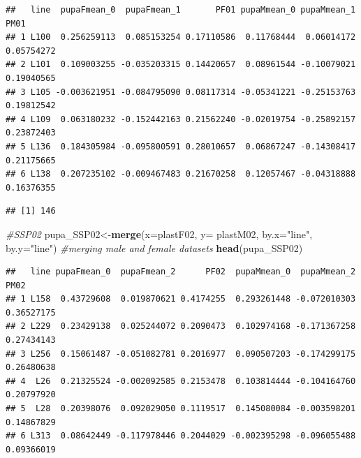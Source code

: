 \documentclass[
]{article}
\newenvironment{Shaded}{\begin{snugshade}}{\end{snugshade}}
\newcommand{\CommentTok}[1]{\textcolor[rgb]{0.56,0.35,0.01}{\textit{#1}}}
\newcommand{\DataTypeTok}[1]{\textcolor[rgb]{0.13,0.29,0.53}{#1}}
\newcommand{\KeywordTok}[1]{\textcolor[rgb]{0.13,0.29,0.53}{\textbf{#1}}}
\newcommand{\NormalTok}[1]{#1}
\newcommand{\OperatorTok}[1]{\textcolor[rgb]{0.81,0.36,0.00}{\textbf{#1}}}
\newcommand{\StringTok}[1]{\textcolor[rgb]{0.31,0.60,0.02}{#1}}
\begin{document}
\begin{verbatim}
##   line  pupaFmean_0  pupaFmean_1       PF01 pupaMmean_0 pupaMmean_1       PM01
## 1 L100  0.256259113  0.085153254 0.17110586  0.11768444  0.06014172 0.05754272
## 2 L101  0.109003255 -0.035203315 0.14420657  0.08961544 -0.10079021 0.19040565
## 3 L105 -0.003621951 -0.084795090 0.08117314 -0.05341221 -0.25153763 0.19812542
## 4 L109  0.063180232 -0.152442163 0.21562240 -0.02019754 -0.25892157 0.23872403
## 5 L136  0.184305984 -0.095800591 0.28010657  0.06867247 -0.14308417 0.21175665
## 6 L138  0.207235102 -0.009467483 0.21670258  0.12057467 -0.04318888 0.16376355
\end{verbatim}

\begin{Shaded}
\end{Shaded}

\begin{verbatim}
## [1] 146
\end{verbatim}

\begin{Shaded}
\begin{Highlighting}[]
\CommentTok{#SSP02}
\NormalTok{pupa_SSP02<-}\KeywordTok{merge}\NormalTok{(}\DataTypeTok{x=}\NormalTok{plastF02, }\DataTypeTok{y=}\NormalTok{ plastM02, }\DataTypeTok{by.x=}\StringTok{"line"}\NormalTok{, }\DataTypeTok{by.y=}\StringTok{"line"}\NormalTok{) }\CommentTok{#merging male and female datasets}
\KeywordTok{head}\NormalTok{(pupa_SSP02)}
\end{Highlighting}
\end{Shaded}

\begin{verbatim}
##   line pupaFmean_0  pupaFmean_2      PF02  pupaMmean_0  pupaMmean_2       PM02
## 1 L158  0.43729608  0.019870621 0.4174255  0.293261448 -0.072010303 0.36527175
## 2 L229  0.23429138  0.025244072 0.2090473  0.102974168 -0.171367258 0.27434143
## 3 L256  0.15061487 -0.051082781 0.2016977  0.090507203 -0.174299175 0.26480638
## 4  L26  0.21325524 -0.002092585 0.2153478  0.103814444 -0.104164760 0.20797920
## 5  L28  0.20398076  0.092029050 0.1119517  0.145080084 -0.003598201 0.14867829
## 6 L313  0.08642449 -0.117978446 0.2044029 -0.002395298 -0.096055488 0.09366019
\end{verbatim}
\end{document}

